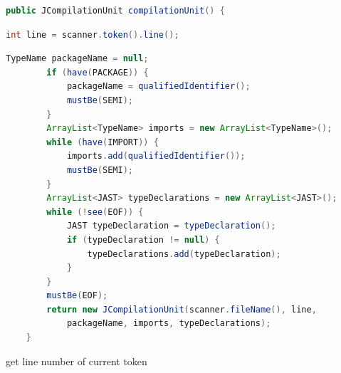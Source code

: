 \documentclass[8pt,a4paper,compress]{beamer}
\begin{document}
\begin{frame}[fragile]
\transdissolve

\begin{tcolorbox}[enhanced,drop shadow southwest,sharp corners,size=fbox,colback=white,fontlower=\small\ttfamily,collower=silver900]

\begin{lstlisting}[language=Java,style=focusout]
    public JCompilationUnit compilationUnit() {
\end{lstlisting}
\begin{lstlisting}[language=Java,style=focusin,backgroundcolor=\color{lime100}]
        int line = scanner.token().line();
\end{lstlisting}
\begin{lstlisting}[language=Java,style=focusout]
        TypeName packageName = null;
        if (have(PACKAGE)) {
            packageName = qualifiedIdentifier();
            mustBe(SEMI);
        }
        ArrayList<TypeName> imports = new ArrayList<TypeName>();
        while (have(IMPORT)) {
            imports.add(qualifiedIdentifier());
            mustBe(SEMI);
        }
        ArrayList<JAST> typeDeclarations = new ArrayList<JAST>();
        while (!see(EOF)) {
            JAST typeDeclaration = typeDeclaration();
            if (typeDeclaration != null) {
                typeDeclarations.add(typeDeclaration);
            }
        }
        mustBe(EOF);
        return new JCompilationUnit(scanner.fileName(), line, 
            packageName, imports, typeDeclarations);
    }
\end{lstlisting}

\tcblower
\begin{minipage}[t][.25cm][t]{\textwidth}
get line number of current token
\end{minipage}
\end{tcolorbox}
\end{frame}
\end{document}
